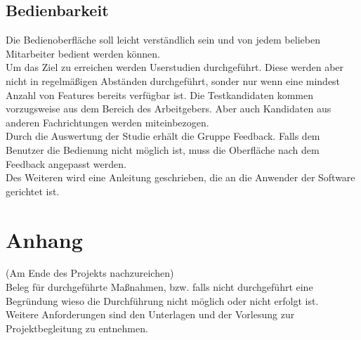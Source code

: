 \documentclass[accentcolor=tud9c,12pt,paper=a4]{tudreport}
\begin{document}
		\section{Bedienbarkeit}
			Die Bedienoberfläche soll leicht verständlich sein und von jedem
			belieben Mitarbeiter bedient werden können.
			\\[5pt]
			Um das Ziel zu erreichen werden Userstudien durchgeführt.
			Diese werden aber nicht in regelmäßigen Abständen durchgeführt,
			sonder nur wenn eine mindest Anzahl von Features bereits
			verfügbar ist. Die Testkandidaten kommen vorzugsweise aus dem
			Bereich des Arbeitgebers. Aber auch Kandidaten aus anderen
			Fachrichtungen werden miteinbezogen.
			\\[5pt]
			Durch die Auswertung der Studie erhält die Gruppe Feedback.
			Falls dem Benutzer die Bedienung nicht möglich ist, muss die
			Oberfläche nach dem Feedback angepasst werden.
			\\[5pt]
			Des Weiteren wird eine Anleitung geschrieben, die an die Anwender der Software
			gerichtet ist.

\appendix
	\chapter{Anhang}
		(Am Ende des Projekts nachzureichen)\\
		Beleg für durchgeführte Maßnahmen, bzw. falls nicht durchgeführt eine Begründung wieso die Durchführung nicht möglich oder nicht erfolgt ist. \\
		Weitere Anforderungen sind den Unterlagen und der Vorlesung zur Projektbegleitung zu entnehmen.
\end{document}
